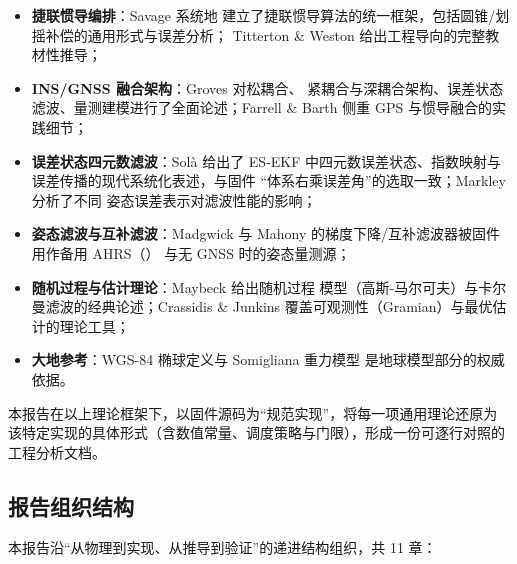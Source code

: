 \begin{itemize}
  \item \textbf{捷联惯导编排}：Savage \cite{Savage1998,Savage1998b} 系统地
    建立了捷联惯导算法的统一框架，包括圆锥/划摇补偿的通用形式与误差分析；
    Titterton \& Weston \cite{Titterton2014} 给出工程导向的完整教材性推导；
  \item \textbf{INS/GNSS 融合架构}：Groves \cite{Groves2013} 对松耦合、
    紧耦合与深耦合架构、误差状态滤波、量测建模进行了全面论述；Farrell \&
    Barth \cite{Farrell2000} 侧重 GPS 与惯导融合的实践细节；
  \item \textbf{误差状态四元数滤波}：Sol{\`a} \cite{Sola2017} 给出了
    ES-EKF 中四元数误差状态、指数映射与误差传播的现代系统化表述，与固件
    ``体系右乘误差角''的选取一致；Markley \cite{Markley1999} 分析了不同
    姿态误差表示对滤波性能的影响；
  \item \textbf{姿态滤波与互补滤波}：Madgwick \cite{Madgwick2011} 与 Mahony
    \cite{Mahony2008} 的梯度下降/互补滤波器被固件用作备用 AHRS（）
    与无 GNSS 时的姿态量测源；
  \item \textbf{随机过程与估计理论}：Maybeck \cite{Maybeck1979} 给出随机过程
    模型（高斯-马尔可夫）与卡尔曼滤波的经典论述；Crassidis \& Junkins
    \cite{crassidis2011} 覆盖可观测性（Gramian）与最优估计的理论工具；
  \item \textbf{大地参考}：WGS-84 椭球定义与 Somigliana 重力模型
    \cite{NAVSTAR2000} 是地球模型部分的权威依据。
\end{itemize}

本报告在以上理论框架下，以固件源码为``规范实现''，将每一项通用理论还原为
该特定实现的具体形式（含数值常量、调度策略与门限），形成一份可逐行对照的
工程分析文档。

\subsection{报告组织结构}

本报告沿``从物理到实现、从推导到验证''的递进结构组织，共 11 章：

